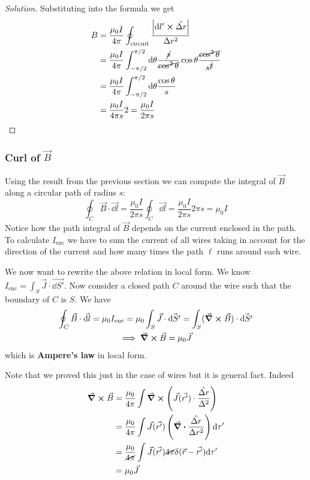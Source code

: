 \documentclass[12pt]{extarticle}
\begin{document}
\begin{proof}[Solution]
    Substituting into the formula we get
    \begin{align}
        B & = \frac{\mu_0 I}{4 \pi} \oint_\text{circuit} \frac{\abs{\dd l' \cross \hat{\Delta r}}}{\Delta r^2}                                                           \\
          & = \frac{\mu_0 I}{4 \pi} \int_{-\pi/2}^{\pi/2} \dd \theta \frac{\cancel{s}}{\cancel{\cos^2 \theta}} \cos \theta \frac{\cancel{\cos^2 \theta}}{s^{\cancel{2}}} \\
          & = \frac{\mu_0 I}{4 \pi} \int_{-\pi/2}^{\pi/2} \dd \theta \frac{\cos \theta}{s}                                                                               \\
          & = \frac{\mu_0 I}{4 \pi s} 2 = \frac{\mu_0 I}{2 \pi s}
    \end{align}
\end{proof}


\subsubsection{Curl of \texorpdfstring{$\vec B$}{B}}

Using the result from the previous section we can compute the integral of $\vec B$ along a circular path of radius $s$:
\begin{equation}
    \oint_C \vec B \cdot \vec{\dd l} =
    \frac{\mu_0 I}{2 \pi s} \oint_C \vec{\dd l} =
    \frac{\mu_0 I}{2 \pi s} 2 \pi s = \mu_0 I
\end{equation}
Notice how the path integral of $\vec B$ depends on the current enclosed in the path.
To calculate $I_\text{enc}$ we have to sum the current of all wires taking in account
for the direction of the current and how many times the path $\ell$ runs around each wire.

We now want to rewrite the above relation in local form.
We know $I_\text{enc} = \int_S \vec J \cdot \vec{\dd S'}$.
Now consider a closed path $C$ around the wire such that the boundary of $C$ is $S$.
We have
\begin{gather}
    \oint_C \vec B \cdot \vec{\dd l} = \mu_0 I_\text{enc} = \mu_0 \int_S \vec J \cdot \vec{\dd S'} = \int_S (\curl \vec B) \cdot \vec{\dd S'} \\
    \implies \curl \vec B = \mu_0 \vec J
\end{gather}
which is \textbf{Ampere's law} in local form.

Note that we proved this just in the case of wires but it is general fact.
Indeed
\begin{align}
    \curl \vec B & = \frac{\mu_0}{4 \pi} \int \curl \left( \vec J(\vec{r '}) \cdot \frac{\hat{\Delta r}}{\Delta^2}\right)       \\
                 & = \frac{\mu_0}{4 \pi} \int \vec J(\vec{r '}) \left( \div \frac{\hat{\Delta r}}{\Delta r^2} \right) \dd \tau' \\
                 & = \frac{\mu_0}{\cancel{4 \pi}} \int \vec J(\vec{r '}) \cancel {4 \pi} \delta(\vec r - \vec{r '}) \dd \tau'   \\
                 & = \mu_0 \vec J
\end{align}
\end{document}
